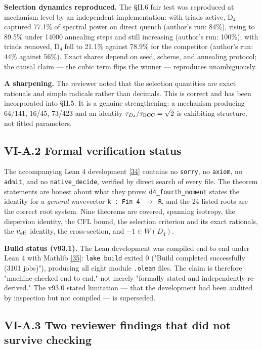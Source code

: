 \documentclass[a4paper,11pt]{article}
\begin{document}
\textbf{Selection dynamics reproduced.} The §II.6 fair test was reproduced at mechanism level by an independent implementation: with triads active, D₄ captured 77.1\% of spectral power on direct quench (author's run: 84\%), rising to 89.5\% under 14000 annealing steps and still increasing (author's run: 100\%); with triads removed, D₄ fell to 21.1\% against 78.9\% for the competitor (author's run: 44\% against 56\%). Exact shares depend on seed, scheme, and annealing protocol; the causal claim — the cubic term flips the winner — reproduces unambiguously.

\textbf{A sharpening.} The reviewer noted that the selection quantities are exact rationals and simple radicals rather than decimals. This is correct and has been incorporated into §II.5. It is a genuine strengthening: a mechanism producing 64/141, 16/45, 73/423 and an identity $\tau_{D_4}/\tau_{\rm BCC} = \sqrt{2}$ is exhibiting structure, not fitted parameters.

\subsection*{VI-A.2 Formal verification status}

The accompanying Lean 4 development \hyperref[ref34]{[34]} contains no \texttt{sorry}, no \texttt{axiom}, no \texttt{admit}, and no \texttt{native\_decide}, verified by direct search of every file. The theorem statements are honest about what they prove: \texttt{d4\_fourth\_moment} states the identity for a \textit{general} wavevector \texttt{k : Fin 4 $\to$ R}, and the 24 listed roots are the correct root system. Nine theorems are covered, spanning isotropy, the dispersion identity, the CFL bound, the selection criterion and its exact rationals, the $u_{\rm eff}$ identity, the cross-section, and $-1\in W(D_4)$.

\textbf{Build status (v93.1).} The Lean development was compiled end to end under Lean 4 with Mathlib \hyperref[ref35]{[35]}: \texttt{lake build} exited 0 ("Build completed successfully (3101 jobs)"), producing all eight module \texttt{.olean} files. The claim is therefore "machine-checked end to end," not merely "formally stated and independently re-derived." The v93.0 stated limitation — that the development had been audited by inspection but not compiled — is superseded.

\subsection*{VI-A.3 Two reviewer findings that did not survive checking}
\end{document}

